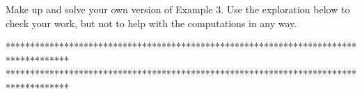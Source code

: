 \documentclass{ximera}
\begin{document}
\begin{example} \label{Ex2:Angles}
Make up and solve your own version of Example 3. Use the exploration below to check your work, but not to help with the computations in any way. 


\begin{exploration}\label{exp:angles2}

 
\begin{onlineOnly}
    \begin{center}
\end{center}
\end{onlineOnly}
\end{exploration}


\end{example}


*************************************************************************************
*************************************************************************************

\fi
\end{document}
